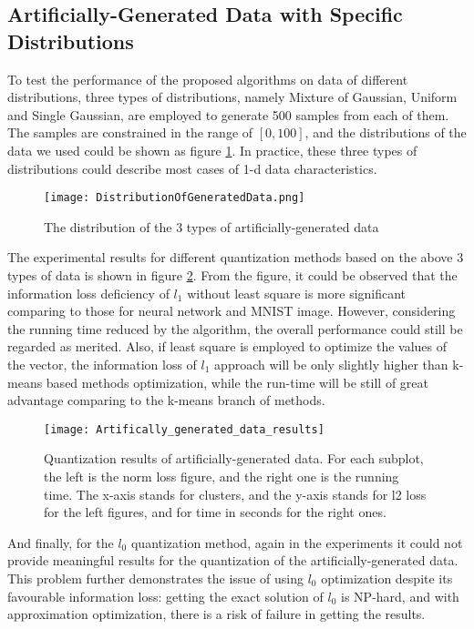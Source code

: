 \documentclass[preprint,10pt]{elsarticle}
\begin{document}
\subsection{Artificially-Generated Data with Specific Distributions}
To test the performance of the proposed algorithms on data of different distributions, three types of distributions, namely Mixture of Gaussian, Uniform and Single Gaussian, are employed to generate 500 samples from each of them. The samples are constrained in the range of $[0,100]$, and the distributions of the data we used could be shown as figure \ref{fig:ArtificialDataIllustration}. In practice, these three types of distributions could describe most cases of 1-d data characteristics.\\
\begin{figure}
\centering 
\texttt{[image: DistributionOfGeneratedData.png]}
\caption{The distribution of the 3 types of artificially-generated data}
\label{fig:ArtificialDataIllustration}
\end{figure}
The experimental results for different quantization methods based on the above 3 types of data is shown in figure \ref{fig:PerformanceartificalGeneratedData}. From the figure, it could be observed that the information loss deficiency of $l_1$ without least square is more significant comparing to those for neural network and MNIST image. However, considering the running time reduced by the algorithm, the overall performance could still be regarded as merited. Also, if least square is employed to optimize the values of the vector, the information loss of $l_1$ approach will be only slightly higher than k-means based methods optimization, while the run-time will be still of great advantage comparing to the k-means branch of methods.\\
\begin{figure}
\centering 
\texttt{[image: Artifically\_generated\_data\_results]}
\caption{Quantization results of artificially-generated data. For each subplot, the left is the norm loss figure, and the right one is the running time. The x-axis stands for clusters, and the y-axis stands for l2 loss for the left figures, and for time in seconds for the right ones.}
\label{fig:PerformanceartificalGeneratedData}
\end{figure}
And finally, for the $l_0$ quantization method, again in the experiments it could not provide meaningful results for the quantization of the artificially-generated data. This problem further demonstrates the issue of using $l_0$ optimization despite its favourable information loss: getting the exact solution of $l_0$ is NP-hard, and with approximation optimization, there is a risk of failure in getting the results.
\end{document}
